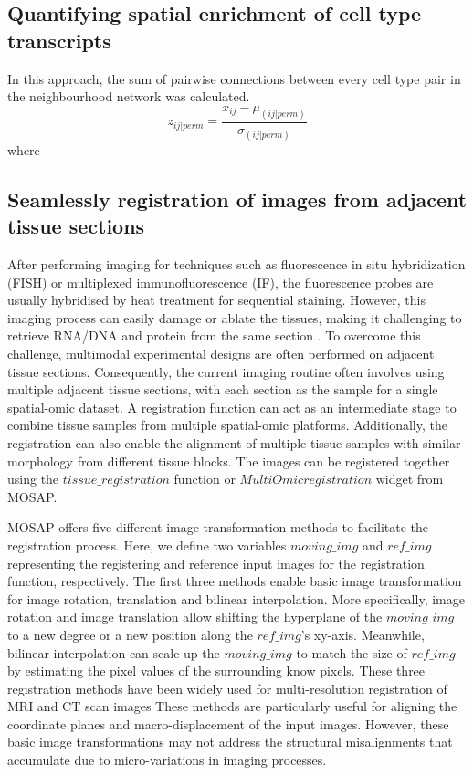 \subsection{Quantifying spatial enrichment of cell type transcripts}
In this approach, the sum of pairwise connections between every cell type pair in the neighbourhood network was calculated.
\begin{equation}
    z_{ij|perm} = \frac{x_{ij} - \mu_{(ij|perm)}}{\sigma_{(ij|perm)}}
\label{chap4:eq:02}
\end{equation}
where
\subsection{Seamlessly registration of images from adjacent tissue sections}
After performing imaging for techniques such as fluorescence in situ hybridization (FISH) or multiplexed immunofluorescence (IF), the fluorescence probes are usually hybridised by heat treatment for sequential staining. However, this imaging process can easily damage or ablate the tissues, making it challenging to retrieve RNA/DNA and protein from the same section \cite{chen2015spatially, wang2012rnascope, hoyt2021multiplex}. To overcome this challenge, multimodal experimental designs are often performed on adjacent tissue sections. Consequently, the current imaging routine often involves using multiple adjacent tissue sections, with each section as the sample for a single spatial-omic dataset. A registration function can act as an intermediate stage to combine tissue samples from multiple spatial-omic platforms. Additionally, the registration can also enable the alignment of multiple tissue samples with similar morphology from different tissue blocks. The images can be registered together using the $tissue\_registration$ function or $MultiOmic registration$ widget from MOSAP. 

MOSAP offers five different image transformation methods to facilitate the registration process. Here, we define two variables $moving\_img$ and $ref\_img$ representing the registering and reference input images for the registration function, respectively. The first three methods enable basic image transformation for image rotation, translation and bilinear interpolation. More specifically, image rotation and image translation allow shifting the hyperplane of the $moving\_img$ to a new degree or a new position along the $ref\_img$'s xy-axis. Meanwhile, bilinear interpolation can scale up the $moving\_img$ to match the size of $ref\_img$ by estimating the pixel values of the surrounding know pixels. These three registration methods have been widely used for multi-resolution registration of MRI and CT scan images \cite{leng2013medical}  These methods are particularly useful for aligning the coordinate planes and macro-displacement of the input images. However, these basic image transformations may not address the structural misalignments that accumulate due to micro-variations in imaging processes.

